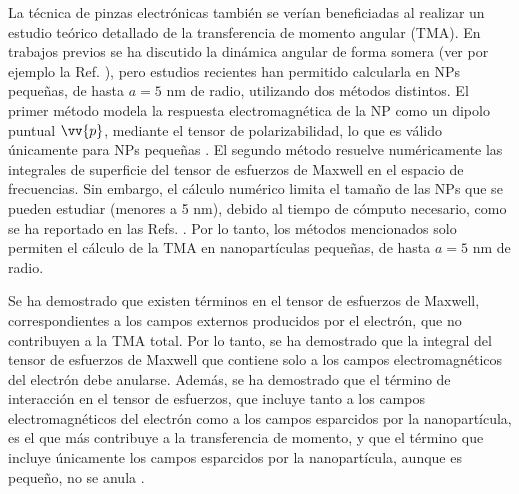 
La técnica de pinzas electrónicas también se verían beneficiadas al realizar un estudio teórico detallado de la transferencia de momento angular (TMA). En trabajos previos se ha discutido la dinámica angular de forma somera (ver por ejemplo la Ref. \cite{GarciadeAbajo-1}), pero estudios recientes han permitido calcularla en NPs pequeñas, de hasta $a=5$ nm de radio, utilizando dos métodos distintos. El primer método modela la respuesta electromagnética de la NP como un dipolo puntual $\vv{p}$, mediante el tensor de polarizabilidad, lo que es válido únicamente para NPs pequeñas \cite{castellanos2021angular}. El segundo método resuelve numéricamente las integrales de superficie del tensor de esfuerzos de Maxwell \cite{castellanos2023theory, castellanos2021phdthesis} en el espacio de frecuencias. Sin embargo, el cálculo numérico limita el tamaño de las NPs que se pueden estudiar (menores a 5 nm), debido al tiempo de cómputo necesario, como se ha reportado en las Refs. \cite{castellanos2021phdthesis, castellanos2021angular,castellanos2023theory}. Por lo tanto, los métodos mencionados solo permiten el cálculo de la TMA en nanopartículas pequeñas, de hasta $a=5$ nm de radio.

Se ha demostrado que existen términos en el tensor de esfuerzos de Maxwell, correspondientes a los campos externos producidos por el electrón, que no contribuyen a la TMA total. Por lo tanto, se ha demostrado que la integral del tensor de esfuerzos de Maxwell que contiene solo a los campos electromagnéticos del electrón debe anularse. Además, se ha demostrado que el término de interacción en el tensor de esfuerzos, que incluye tanto a los campos electromagnéticos del electrón como a los campos esparcidos por la nanopartícula, es el que más contribuye a la transferencia de momento, y que el término que incluye únicamente los campos esparcidos por la nanopartícula, aunque es pequeño, no se anula \cite{castellanos2021phdthesis, castrejon2021phdthesis}.

